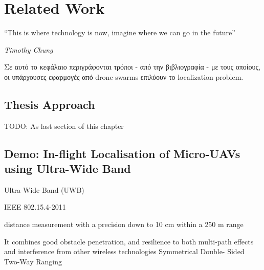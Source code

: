 \chapter{Related Work} %
\label{chap:Chapter3}       %
\epigraph{``This is where technology is now, imagine where we can go in the future” }{\textit{Timothy Chung}}

Σε αυτό το κεφάλαιο περιγράφονται τρόποι - από την βιβλιογραφία - με τους οποίους, οι υπάρχουσες εφαρμογές 
από drone swarms επιλύουν το localization problem. 

\section{Thesis Approach}
TODO: As last section of this chapter
\cite{10.5555/3400306.3400339}
\cite{6907551}
\cite{8355093}
\cite{PMID:33348720}
\cite{article5}
\cite{inproceedings}
\cite{inproceedings2}
\cite{8453331}
\cite{4967999}
\cite{inproceedings51}
\cite{trilateration-application1}


\section{Demo: In-flight Localisation of Micro-UAVs using Ultra-Wide Band}
Ultra-Wide
Band (UWB)

IEEE 802.15.4-2011 

distance measurement with a precision down to 10 cm within
a 250 m range

It combines good obstacle penetration, and
resilience to both multi-path effects and interference from
other wireless technologies
Symmetrical Double-
Sided Two-Way Ranging 

